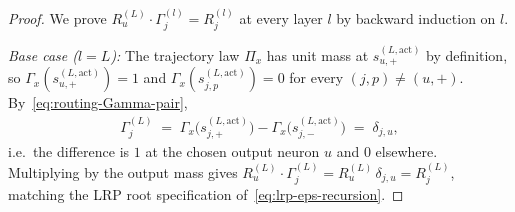 \documentclass[twoside]{article}
\newcommand{\1}{\mathbf{1}}
\begin{document}
\begin{proof}
We prove $R_u^{(L)} \cdot \Gamma^{(l)}_j = R^{(l)}_j$ at every layer $l$ by backward induction on
$l$.

\emph{Base case ($l = L$):} The trajectory law $\Pi_x$ has unit mass at
$s_{u,+}^{(L,\mathrm{act})}$ by definition, so $\Gamma_x(s_{u,+}^{(L,\mathrm{act})}) = 1$ and
$\Gamma_x(s_{j,p}^{(L,\mathrm{act})}) = 0$ for every $(j,p) \neq (u,+)$.
By~\eqref{eq:routing-Gamma-pair},
\begin{align}
    \Gamma^{(L)}_j \;=\; \Gamma_x\!\bigl(s_{j,+}^{(L,\mathrm{act})}\bigr) -
    \Gamma_x\!\bigl(s_{j,-}^{(L,\mathrm{act})}\bigr) \;=\; \delta_{j,u},
\end{align}
i.e.\ the difference is $1$ at the chosen output neuron $u$ and $0$ elsewhere. Multiplying by the
output mass gives $R_u^{(L)} \cdot \Gamma^{(L)}_j = R_u^{(L)}\,\delta_{j,u} = R^{(L)}_j$, matching
the LRP root specification of~\eqref{eq:lrp-eps-recursion}.


\end{proof}
\end{document}
